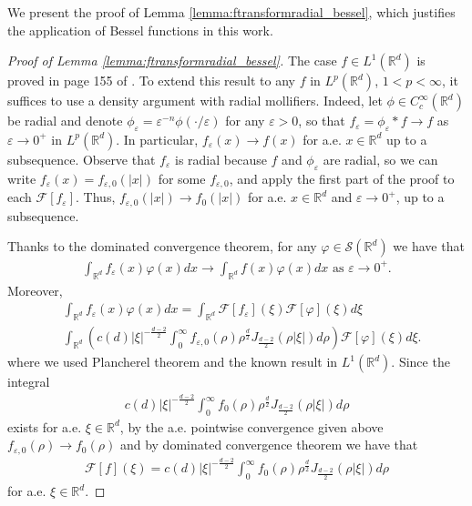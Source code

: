 \documentclass[a4paper, reqno, 11pt]{amsart}
\theoremstyle{definition}
\begin{document}
We present the proof of Lemma \ref{lemma:ftransformradial_bessel}, which justifies the application of Bessel functions in this work. 
	\begin{proof}[Proof of Lemma \ref{lemma:ftransformradial_bessel}]
	The case $f \in L^1(\mathbb{R}^d)$ is proved in page 155 of \cite{steinweiss}. To extend this result to any $f$ in $L^p(\mathbb{R}^d)$, $1 < p < \infty$, it suffices to use a density argument with radial mollifiers. Indeed, let $\phi \in C^{\infty}_c(\mathbb{R}^d)$ be radial and denote $\phi_{\varepsilon} = \varepsilon^{-n}\phi(\cdot/\varepsilon)$ for any $\varepsilon > 0$, so that $f_{\varepsilon} = \phi_{\varepsilon} \ast f \rightarrow f$ as $\varepsilon \rightarrow 0^+$ in $L^p(\mathbb{R}^d)$. In particular, $f_{\varepsilon}(x) \rightarrow f(x)$ for a.e. $x \in \mathbb{R}^d$ up to a subsequence. Observe that $f_{\varepsilon}$ is radial because $f$ and $\phi_{\varepsilon}$ are radial, so we can write $f_{\varepsilon}(x) = f_{\varepsilon,0}(|x|)$ for some $f_{\varepsilon,0}$, and apply the first part of the proof to each $\mathcal{F}[f_{\varepsilon}]$. Thus, $f_{\varepsilon,0}(|x|) \rightarrow f_0(|x|)$ for a.e. $x \in \mathbb{R}^d$ and $\varepsilon \rightarrow 0^+$, up to a subsequence.
	
Thanks to the dominated convergence theorem, for any $\varphi \in \mathcal{S}(\mathbb{R}^d)$ we have that
	\begin{align*}
	\int_{\mathbb{R}^d} f_{\varepsilon}(x) \varphi(x) dx \rightarrow \int_{\mathbb{R}^d} f(x) \varphi(x) dx \text{ as } \varepsilon \rightarrow 0^+.
	\end{align*}
	Moreover, 
	\begin{align*}
	&\int_{\mathbb{R}^d} f_{\varepsilon}(x) \varphi(x) dx = \int_{\mathbb{R}^d} \mathcal{F}[f_{\varepsilon}](\xi) \mathcal{F}[\varphi](\xi) d\xi \nonumber \\
	& \int_{\mathbb{R}^d} \left( c(d) |\xi|^{-\frac{d-2}{2}} \int_0^{\infty} f_{\varepsilon,0}(\rho) \rho^{\frac{d}{2}} J_{\frac{d-2}{2}}(\rho|\xi|) d\rho \right) \mathcal{F}[\varphi](\xi) d\xi.
	\end{align*}
	where we used Plancherel theorem and the known result in $L^1(\mathbb{R}^d)$. Since the integral
	\begin{align*}
	c(d) |\xi|^{-\frac{d-2}{2}} \int_0^{\infty} f_0(\rho) \rho^{\frac{d}{2}} J_{\frac{d-2}{2}}(\rho|\xi|) d\rho
	\end{align*}
	exists for a.e. $\xi \in \mathbb{R}^d$, by the a.e. pointwise convergence given above $f_{\varepsilon,0}(\rho) \rightarrow f_0(\rho)$ and by dominated convergence theorem we have that
	\begin{align*}
	\mathcal{F}[f](\xi) = c(d) |\xi|^{-\frac{d-2}{2}} \int_0^{\infty} f_0(\rho) \rho^{\frac{d}{2}} J_{\frac{d-2}{2}}(\rho|\xi|) d\rho
	\end{align*}
	for a.e. $\xi \in \mathbb{R}^d$.
	\end{proof}
\end{document}
